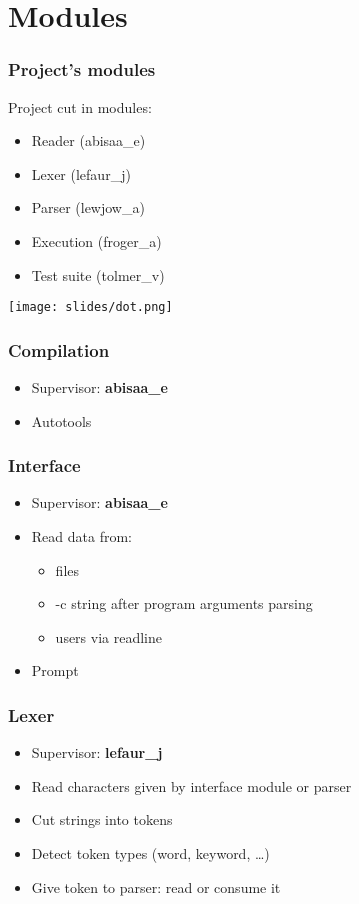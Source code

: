 \section{Modules}
\setcounter{subsection}{1}
\begin{frame}
\frametitle{Project's modules}
  Project cut in modules:
  \begin{itemize}[<+->]
    \item Reader (abisaa\_e)
    \item Lexer (lefaur\_j)
    \item Parser (lewjow\_a)
    \item Execution (froger\_a)
    \item Test suite (tolmer\_v)
  \end{itemize}
\end{frame}

\begin{frame}
  \hspace*{-32pt}
    \texttt{[image: slides/dot.png]}
\end{frame}

\begin{frame}
\frametitle{Compilation}
  \begin{itemize}[<+->]
    \item Supervisor: \textbf{abisaa\_e}
    \item Autotools
  \end{itemize}
\end{frame}

\begin{frame}
\frametitle{Interface}
  \begin{itemize}[<+->]
    \item Supervisor: \textbf{abisaa\_e}
    \item Read data from:
      \begin{itemize}[<+->]
        \item files
        \item -c string after program arguments parsing
        \item users via readline
      \end{itemize}
    \item Prompt
  \end{itemize}
\end{frame}

\begin{frame}
\frametitle{Lexer}
  \begin{itemize}[<+->]
    \item Supervisor: \textbf{lefaur\_j}
    \item Read characters given by interface module or parser
    \item Cut strings into tokens
    \item Detect token types (word, keyword, \ldots)
    \item Give token to parser: read or consume it
  \end{itemize}
\end{frame}

